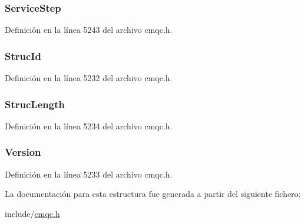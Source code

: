 \subsubsection[{Service\+Step}]{ Service\+Step}\label{structtag_m_q_w_i_h_a6374b5b4fad2f2a335b40c1eb8d523dc}


Definición en la línea 5243 del archivo cmqc.\+h.

\hypertarget{structtag_m_q_w_i_h_a0530922ca944569b52601d74941f96e4}{}
\subsubsection[{Struc\+Id}]{ Struc\+Id}\label{structtag_m_q_w_i_h_a0530922ca944569b52601d74941f96e4}


Definición en la línea 5232 del archivo cmqc.\+h.

\hypertarget{structtag_m_q_w_i_h_a830af9a4a08c015b9a4b2d39d4d3420a}{}
\subsubsection[{Struc\+Length}]{ Struc\+Length}\label{structtag_m_q_w_i_h_a830af9a4a08c015b9a4b2d39d4d3420a}


Definición en la línea 5234 del archivo cmqc.\+h.

\hypertarget{structtag_m_q_w_i_h_a0656ef8f766b3907d394d88a35d7b7e9}{}
\subsubsection[{Version}]{ Version}\label{structtag_m_q_w_i_h_a0656ef8f766b3907d394d88a35d7b7e9}


Definición en la línea 5233 del archivo cmqc.\+h.



La documentación para esta estructura fue generada a partir del siguiente fichero\+:\begin{DoxyCompactItemize}
\item 
include/\hyperlink{cmqc_8h}{cmqc.\+h}\end{DoxyCompactItemize}

